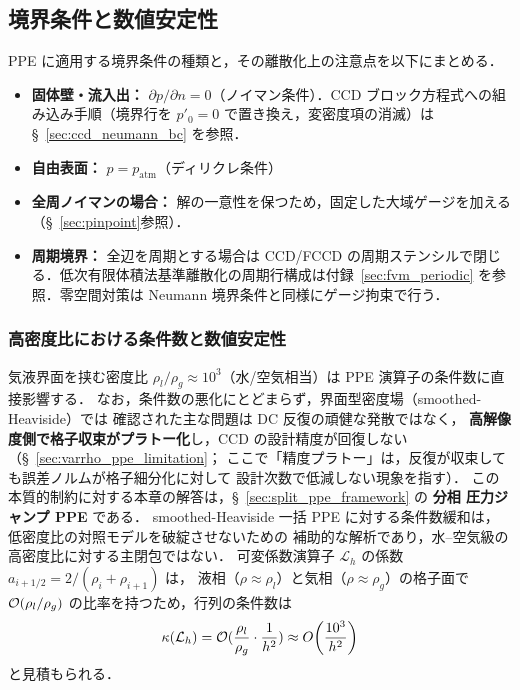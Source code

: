 %
%
\subsection{境界条件と数値安定性}
\label{sec:ppe_bc_stability}

PPE に適用する境界条件の種類と，その離散化上の注意点を以下にまとめる．
\begin{itemize}
    \item \textbf{固体壁・流入出：} $\partial p/\partial n = 0$（ノイマン条件）．CCD ブロック方程式への組み込み手順（境界行を $p'_0=0$ で置き換え，変密度項の消滅）は §~\ref{sec:ccd_neumann_bc} を参照．
    \item \textbf{自由表面：} $p = p_{\mathrm{atm}}$（ディリクレ条件）
    \item \textbf{全周ノイマンの場合：} 解の一意性を保つため，固定した大域ゲージを加える（§~\ref{sec:pinpoint}参照）．
    \item \textbf{周期境界：} 全辺を周期とする場合は CCD/FCCD の周期ステンシルで閉じる．低次有限体積法基準離散化の周期行構成は付録~\ref{sec:fvm_periodic} を参照．零空間対策は Neumann 境界条件と同様にゲージ拘束で行う．
\end{itemize}


\subsubsection{高密度比における条件数と数値安定性}
\label{sec:ppe_condition_number}

気液界面を挟む密度比 $\rho_l/\rho_g \approx 10^3$（水/空気相当）は
PPE 演算子の条件数に直接影響する．
なお，条件数の悪化にとどまらず，界面型密度場（smoothed-Heaviside）では
確認された主な問題は DC 反復の頑健な発散ではなく，
\textbf{高解像度側で格子収束がプラトー化}し，CCD の設計精度が回復しない
（§~\ref{sec:varrho_ppe_limitation}；
ここで「精度プラトー」は，反復が収束しても誤差ノルムが格子細分化に対して
設計次数で低減しない現象を指す）．
この本質的制約に対する本章の解答は，§~\ref{sec:split_ppe_framework} の
\textbf{分相 圧力ジャンプ PPE} である．
smoothed-Heaviside 一括 PPE に対する条件数緩和は，低密度比の対照モデルを破綻させないための
補助的な解析であり，水--空気級の高密度比に対する主閉包ではない．
可変係数演算子 $\mathcal{L}_h$ の係数 $a_{i+1/2} = 2/(\rho_i+\rho_{i+1})$ は，
液相（$\rho \approx \rho_l$）と気相（$\rho \approx \rho_g$）の格子面で
$\mathcal{O}(\rho_l/\rho_g)$ の比率を持つため，行列の条件数は
\begin{equation}
  \kappa(\mathcal{L}_h) = \mathcal{O}(\frac{\rho_l}{\rho_g}\cdot\frac{1}{h^2})
  \approx O\!\left(\frac{10^3}{h^2}\right)
  \label{eq:ppe_cond_number}
\end{equation}
と見積もられる．

